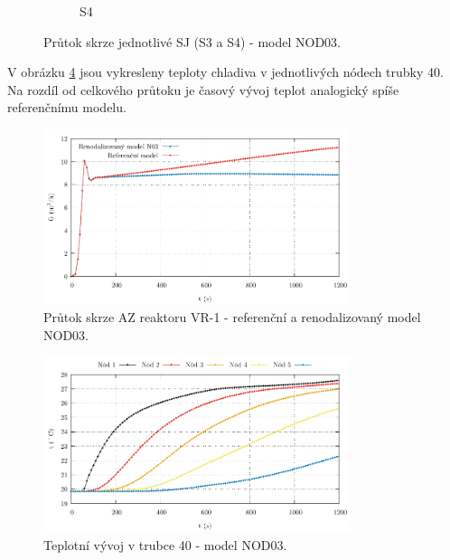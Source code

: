 \begin{figure}[H]
\begin{subfigure}{0.5\textwidth}
		\caption{S4}
		\label{fig:nod_03_mass_flow_rate_horizontal_s4}
	\end{subfigure}%
	\caption{Průtok skrze jednotlivé SJ (S3 a S4) - model NOD03.}
\end{figure}
V obrázku \ref{fig:nod_03_temp_pipe_40} jsou vykresleny teploty chladiva v jednotlivých nódech trubky 40. Na rozdíl od celkového průtoku je časový vývoj teplot analogický spíše referenčnímu modelu. 
  \begin{figure}[H]
 	\centering
 	\includegraphics[width=0.8\textwidth]{./05_TH_model_VR_1/grafy/nod_03_mass_flow_rate_vertical.pdf}
 	\caption{Průtok skrze AZ reaktoru VR-1 - referenční a renodalizovaný model NOD03. }
 	\label{fig:nod_03_mass_flow_rate_vertical}
 \end{figure}
 \begin{figure}[H]
 	\centering
 	\includegraphics[width=0.8\textwidth]{./05_TH_model_VR_1/grafy/t_nod_03.pdf}
 	\caption{Teplotní vývoj v trubce 40 - model NOD03.}
 	\label{fig:nod_03_temp_pipe_40}
 \end{figure}
% 
